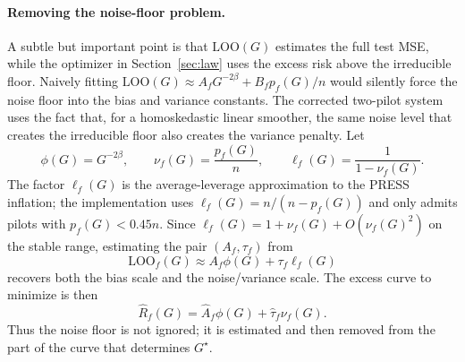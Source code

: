 \documentclass{article}
\newcommand{\LoO}{\mathrm{LOO}}
\begin{document}
\paragraph{Removing the noise-floor problem.}
A subtle but important point is that $\LoO(G)$ estimates the full test MSE, while the optimizer in Section~\ref{sec:law} uses the excess risk above the irreducible floor. Naively fitting
$\LoO(G)\approx A_fG^{-2\beta}+B_fp_f(G)/n$ would silently force the noise floor into the bias and variance constants. The corrected two-pilot system uses the fact that, for a homoskedastic linear smoother, the same noise level that creates the irreducible floor also creates the variance penalty. Let
\begin{equation}
    \phi(G)=G^{-2\beta},
    \qquad
    \nu_f(G)=\frac{p_f(G)}{n},
    \qquad
    \ell_f(G)=\frac{1}{1-\nu_f(G)}.
    \label{eq:pilot_features}
\end{equation}
The factor $\ell_f(G)$ is the average-leverage approximation to the PRESS inflation; the implementation uses $\ell_f(G)=n/(n-p_f(G))$ and only admits pilots with $p_f(G)<0.45n$. Since $\ell_f(G)=1+\nu_f(G)+O(\nu_f(G)^2)$ on the stable range, estimating the pair $(A_f,\tau_f)$ from
\begin{equation}
    \LoO_f(G) \approx A_f\phi(G)+\tau_f\ell_f(G)
    \label{eq:loo_pilot_law}
\end{equation}
recovers both the bias scale and the noise/variance scale. The excess curve to minimize is then
\begin{equation}
    \widehat R_f(G)=\widehat A_f\phi(G)+\widehat\tau_f\nu_f(G).
    \label{eq:excess_curve_hat}
\end{equation}
Thus the noise floor is not ignored; it is estimated and then removed from the part of the curve that determines $G^\star$.
\end{document}
